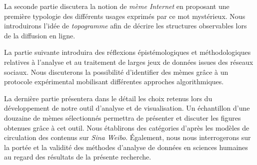 La seconde partie discutera la notion de \textit{mème Internet} en proposant une première typologie des différents usages exprimés par ce mot mystérieux. Nous introduirons l'idée de \textit{topogramme} afin de décrire les structures observables lors de la diffusion en ligne.

La partie suivante introduira des réflexions épistémologiques et méthodologiques relatives à l'analyse et au traitement de larges jeux de données issues des réseaux sociaux. Nous discuterons la possibilité d'identifier des mèmes grâce à un protocole expérimental mobilisant différentes approches algorithmiques.

La dernière partie présentera dans le détail les choix retenus lors du développement de notre outil d'analyse et de visualisation. Un échantillon d'une douzaine de mèmes sélectionnés permettra de présenter et discuter les figures obtenues grâce à cet outil. Nous établirons des catégories d'après les modèles de circulation des contenus sur \textit{Sina Weibo}. \'Egalement, nous nous interrogerons sur la portée et la validité des méthodes d'analyse de données en sciences humaines au regard des résultats de la présente recherche.





